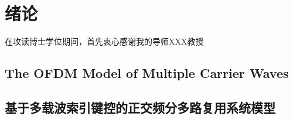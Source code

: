 \documentclass[bachelor]{thesis-uestc}
\begin{document}
\thesistableofcontents

\chapter{绪\hspace{6pt}论}


\thesisacknowledgement
在攻读博士学位期间，首先衷心感谢我的导师XXX教授

\thesisappendix




%







\thesistranslationoriginal
\section{The OFDM Model of Multiple Carrier Waves}

\thesistranslationchinese
\section{基于多载波索引键控的正交频分多路复用系统模型}
\end{document}
